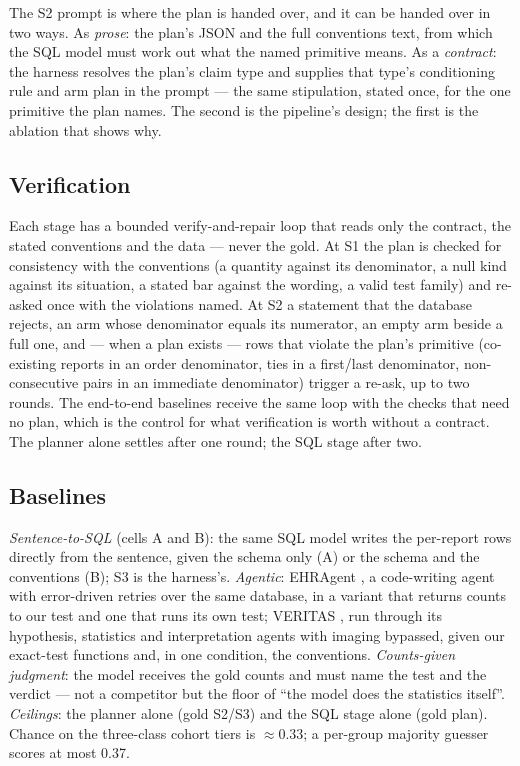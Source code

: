 The S2 prompt is where the plan is handed over, and it can be handed over in
two ways. As \emph{prose}: the plan's JSON and the full conventions text, from
which the SQL model must work out what the named primitive means. As a
\emph{contract}: the harness resolves the plan's claim type and supplies that
type's conditioning rule and arm plan in the prompt --- the same stipulation,
stated once, for the one primitive the plan names. The second is the
pipeline's design; the first is the ablation that shows why.

\subsection{Verification}
\label{sec:verify}

Each stage has a bounded verify-and-repair loop that reads only the contract,
the stated conventions and the data --- never the gold. At S1 the plan is
checked for consistency with the conventions (a quantity against its
denominator, a null kind against its situation, a stated bar against the
wording, a valid test family) and re-asked once with the violations named. At
S2 a statement that the database rejects, an arm whose denominator equals its
numerator, an empty arm beside a full one, and --- when a plan exists --- rows
that violate the plan's primitive (co-existing reports in an order
denominator, ties in a first/last denominator, non-consecutive pairs in an
immediate denominator) trigger a re-ask, up to two rounds. The end-to-end
baselines receive the same loop with the checks that need no plan, which is
the control for what verification is worth without a contract. The planner
alone settles after one round; the SQL stage after two.

\subsection{Baselines}
\label{sec:baselines}

\emph{Sentence-to-SQL} (cells A and B): the same SQL model writes the
per-report rows directly from the sentence, given the schema only (A) or the
schema and the conventions (B); S3 is the harness's. \emph{Agentic}: EHRAgent
\cite{shi2024ehragent}, a code-writing agent with error-driven retries over the
same database, in a variant that returns counts to our test and one that runs
its own test; VERITAS \cite{veritas2026}, run through its hypothesis,
statistics and interpretation agents with imaging bypassed, given our exact-test
functions and, in one condition, the conventions. \emph{Counts-given judgment}:
the model receives the gold counts and must name the test and the verdict ---
not a competitor but the floor of ``the model does the statistics itself''.
\emph{Ceilings}: the planner alone (gold S2/S3) and the SQL stage alone (gold
plan). Chance on the three-class cohort tiers is $\approx 0.33$; a per-group
majority guesser scores at most 0.37.


